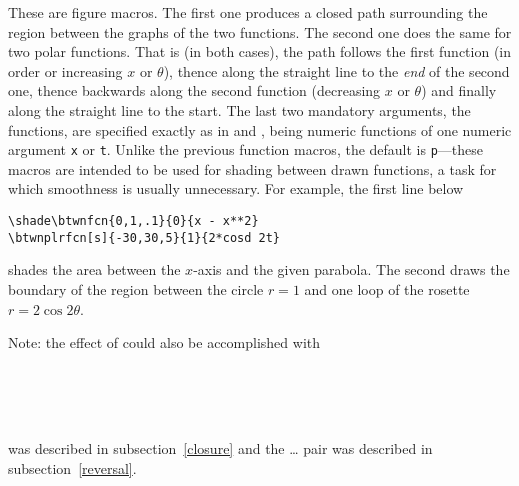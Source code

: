 \documentclass[letterpaper]{article}
\begin{document}
These are figure macros. The first one produces a closed path
surrounding the region between the graphs of the two functions. The
second one does the same for two polar functions. That is (in both
cases), the path follows the first function (in order or increasing $x$
or $\theta$), thence along the straight line to the \emph{end} of the
second one, thence backwards along the second function (decreasing $x$
or $\theta$) and finally along the straight line to the start. The last
two mandatory arguments, the functions, are specified exactly as in
 and , being numeric functions of one numeric
argument \texttt{x} or \texttt{t}. Unlike the previous function macros,
the default  is \texttt{p}---these macros are intended to be
used for shading between drawn functions, a task for which smoothness is
usually unnecessary. For example, the first line below
\begin{verbatim}
\shade\btwnfcn{0,1,.1}{0}{x - x**2}
\btwnplrfcn[s]{-30,30,5}{1}{2*cosd 2t}
\end{verbatim}
shades the area between the $x$-axis and the given parabola. The second
draws the boundary of the region between the circle $r = 1$ and one loop
of the rosette $r = 2\cos 2\theta$.

Note: the effect of  could also be accomplished with
\begin{ex}
  \\
    \\
    \\
\end{ex}
 was described in subsection~\ref{closure} and the
\dots{} pair was described in
subsection~\ref{reversal}.

\begin{cd}
%
    \\
%
%
\end{cd}
\end{document}
